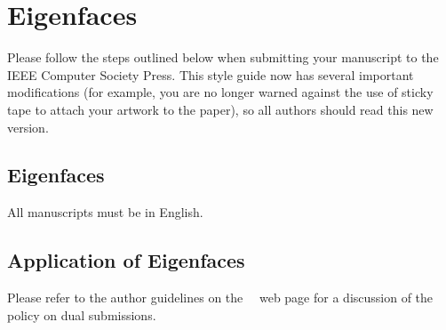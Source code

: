 \section{Eigenfaces}
\label{sec:intro}

Please follow the steps outlined below when submitting your manuscript to the IEEE Computer Society Press.
This style guide now has several important modifications (for example, you are no longer warned against the use of sticky tape to attach your artwork to the paper), so all authors should read this new version.

\subsection{Eigenfaces}

All manuscripts must be in English.

\subsection{Application of Eigenfaces}

Please refer to the author guidelines on the \confName\ \confYear\ web page for a
discussion of the policy on dual submissions.